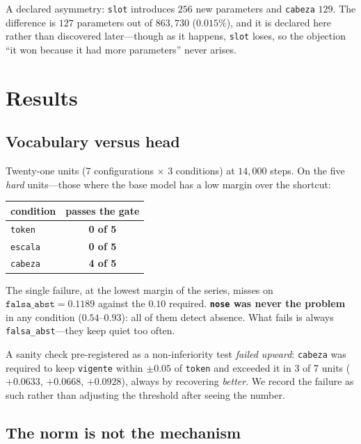 \documentclass[11pt,a4paper]{article}
\begin{document}
A declared asymmetry: \texttt{slot} introduces $256$ new parameters and \texttt{cabeza} $129$. The
difference is $127$ parameters out of $863{,}730$ ($0.015\%$), and it is declared here rather than
discovered later---though as it happens, \texttt{slot} loses, so the objection ``it won because it
had more parameters'' never arises.

\section{Results}

\subsection{Vocabulary versus head}

Twenty-one units (7 configurations $\times$ 3 conditions) at $14{,}000$ steps. On the five
\emph{hard} units---those where the base model has a low margin over the shortcut:

\begin{center}
\begin{tabular}{lc}
\toprule
condition & passes the gate \\
\midrule
\texttt{token}  & \textbf{0 of 5} \\
\texttt{escala} & \textbf{0 of 5} \\
\texttt{cabeza} & \textbf{4 of 5} \\
\bottomrule
\end{tabular}
\end{center}

The single failure, at the lowest margin of the series, misses on
$\texttt{falsa\_abst} = 0.1189$ against the $0.10$ required. \textbf{\texttt{nose} was never the
problem} in any condition ($0.54$--$0.93$): all of them detect absence. What fails is always
\texttt{falsa\_abst}---they keep quiet too often.

A sanity check pre-registered as a non-inferiority test \emph{failed upward}: \texttt{cabeza} was
required to keep \texttt{vigente} within $\pm 0.05$ of \texttt{token} and exceeded it in 3 of 7
units ($+0.0633$, $+0.0668$, $+0.0928$), always by recovering \emph{better}. We record the failure
as such rather than adjusting the threshold after seeing the number.

\subsection{The norm is not the mechanism}
\label{sec:escala}
\end{document}
